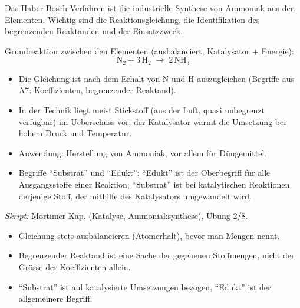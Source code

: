 

Das Haber-Bosch-Verfahren ist die industrielle Synthese von Ammoniak aus den
Elementen. Wichtig sind die Reaktionsgleichung, die Identifikation des
begrenzenden Reaktanden und der Einsatzzweck.

\begin{werkzeugkasten}
Grundreaktion zwischen den Elementen (ausbalanciert, Katalysator + Energie):
\begin{equation}
  \mathrm{N_2} + 3\,\mathrm{H_2} \;\to\; 2\,\mathrm{NH_3}
\end{equation}
\begin{itemize}
  \item Die Gleichung ist nach dem Erhalt von N und H auszugleichen
        (Begriffe aus A7: Koeffizienten, begrenzender Reaktand).
  \item In der Technik liegt meist Stickstoff (aus der Luft, quasi
        unbegrenzt verfügbar) im Ueberschuss vor; der Katalysator wärmt die
        Umsetzung bei hohem Druck und Temperatur.
  \item Anwendung: Herstellung von Ammoniak, vor allem für Düngemittel.
  \item Begriffe ``Substrat'' und ``Edukt'': ``Edukt'' ist der
        Oberbegriff für alle Ausgangsstoffe einer Reaktion; ``Substrat'' ist
        bei katalytischen Reaktionen derjenige Stoff, der mithilfe des
        Katalysators umgewandelt wird.
\end{itemize}
\textit{Skript:} Mortimer Kap. (Katalyse, Ammoniaksynthese), Übung 2/8.
\end{werkzeugkasten}

\begin{achtung}
\begin{itemize}
  \item Gleichung stets ausbalancieren (Atomerhalt), bevor man Mengen nennt.
  \item Begrenzender Reaktand ist eine Sache der gegebenen Stoffmengen, nicht
        der Grösse der Koeffizienten allein.
  \item ``Substrat'' ist auf katalysierte Umsetzungen bezogen, ``Edukt'' ist
        der allgemeinere Begriff.
\end{itemize}
\end{achtung}
